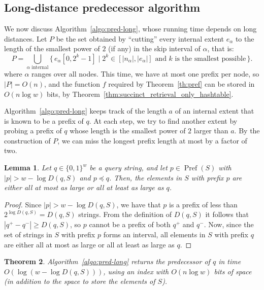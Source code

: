 \documentclass[a4paper,11pt]{article}
\newtheorem{theorem}{Theorem}[section]
\newtheorem{lemma}[theorem]{Lemma}
\newcommand{\?}{\mskip1.5mu}
\DeclareMathOperator{\Pref}{Pref}
\begin{document}
\subsection{Long-distance predecessor algorithm}
\label{sec:long}

We now discuss Algorithm~\ref{algo:pred-long}, whose 
running time depends on long
distances. Let $P$ be the set obtained by ``cutting''
every internal extent $e_\alpha$ to the length of the smallest power of 
$2$ (if any) in the skip interval of $\alpha$, that is:
\[
P =\bigcup_\text{$\alpha$ internal}\{\,e_\alpha[0,2^k -1] \mid 2^k \in
	[|n_\alpha|, |e_\alpha|] \text{ and $k$ is the smallest possible}\,\}.
\]
where $\alpha$ ranges over all nodes. This time, we
have at most one prefix per node, so $|P| = O(n)$, and 
the function $f$ required by Theorem~\ref{th:pref} can be stored 
in $O(n\log w)$ bits, by Theorem~\ref{thm:succinct_retrieval_only_hashtable}. 

Algorithm~\ref{algo:pred-long} keeps track of the length $a$ of an
internal extent that is known to be a prefix of $q$. At each step, we 
try to find another extent by probing a prefix of $q$ whose 
length is the smallest power of $2$ larger than
$a$. By the construction of $P$, we can miss the longest
prefix length at most by a factor of two. 

\begin{lemma}
\label{lemma:shortinprefs}
Let $q \in \{0, 1\}^w$ be a query string,
and let $p \in \Pref(S)$ with 
$|p| > w - \log D(q,S)$ and
$p \preceq q$. Then, 
the elements in $S$ with prefix $p$
are either all at most as large or all
at least as large as $q$.
\end{lemma}

\begin{proof}
Since $|p| > w - \log D(q, S)$, we have
that $p$ is a prefix of less than
$2^{\log D(q,S)} = D(q, S)$ strings.
From the definition of $D(q, S)$ it follows
that $|q^+ - q^-| \geq D(q, S)$, so $p$
cannot be a prefix of both $q^+$ and $q^-$.
Now, since the set of strings in $S$ 
with prefix $p$ forms an interval, all elements
in $S$ with prefix $q$ are either all at most as large
or all at least as large as $q$.
\end{proof}


\begin{theorem}	
\label{thm:pred-long}
Algorithm~\ref{algo:pred-long} returns the predecessor of  $q$
in time $O(\log(w-\log D(q, S)))$, using an index with 
$O(n \log w)$ bits of space (in addition to the space 
to store the elements of $S$).
\end{theorem}
\end{document}
